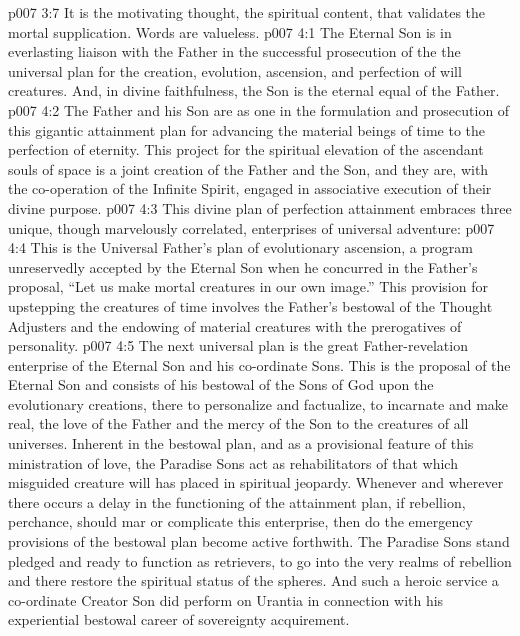 \vs p007 3:7 It is the motivating thought, the spiritual content, that validates the mortal supplication. Words are valueless.
\vs p007 4:1 The Eternal Son is in everlasting liaison with the Father in the successful prosecution of the  the universal plan for the creation, evolution, ascension, and perfection of will creatures. And, in divine faithfulness, the Son is the eternal equal of the Father.
\vs p007 4:2 The Father and his Son are as one in the formulation and prosecution of this gigantic attainment plan for advancing the material beings of time to the perfection of eternity. This project for the spiritual elevation of the ascendant souls of space is a joint creation of the Father and the Son, and they are, with the co\hyp{}operation of the Infinite Spirit, engaged in associative execution of their divine purpose.
\vs p007 4:3 \pc This divine plan of perfection attainment embraces three unique, though marvelously correlated, enterprises of universal adventure:
\vs p007 4:4 \pc {}\bibnobreakspace {} This is the Universal Father’s plan of evolutionary ascension, a program unreservedly accepted by the Eternal Son when he concurred in the Father’s proposal, “Let us make mortal creatures in our own image.” This provision for upstepping the creatures of time involves the Father’s bestowal of the Thought Adjusters and the endowing of material creatures with the prerogatives of personality.
\vs p007 4:5 \pc {}\bibnobreakspace {} The next universal plan is the great Father\hyp{}revelation enterprise of the Eternal Son and his co\hyp{}ordinate Sons. This is the proposal of the Eternal Son and consists of his bestowal of the Sons of God upon the evolutionary creations, there to personalize and factualize, to incarnate and make real, the love of the Father and the mercy of the Son to the creatures of all universes. Inherent in the bestowal plan, and as a provisional feature of this ministration of love, the Paradise Sons act as rehabilitators of that which misguided creature will has placed in spiritual jeopardy. Whenever and wherever there occurs a delay in the functioning of the attainment plan, if rebellion, perchance, should mar or complicate this enterprise, then do the emergency provisions of the bestowal plan become active forthwith. The Paradise Sons stand pledged and ready to function as retrievers, to go into the very realms of rebellion and there restore the spiritual status of the spheres. And such a heroic service a co\hyp{}ordinate Creator Son did perform on Urantia in connection with his experiential bestowal career of sovereignty acquirement.
